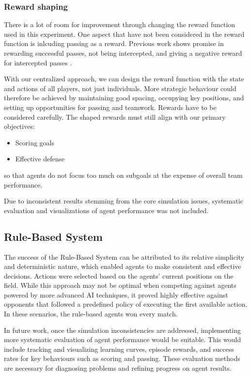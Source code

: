 \subsubsection{Reward shaping}
There is a lot of room for improvement through changing the reward function used in this experiment.
One aspect that have not been considered in the reward function is inlcuding passing as a reward.
Previous work shows promise in rewarding successful passes, not being intercepted, and giving a negative reward for intercepted passes
\cite{SRC2018Team}.

With our centralized approach, we can design the reward function with the state and actions of all players, not just individuals.
More strategic behaviour could therefore be achieved by maintaining good spacing, occupying key positions, and setting up opportunities for passing and teamwork.
Rewards have to be considered carefully. The shaped rewards must still align with our primary objectives:
\begin{itemize}
    \item Scoring goals
    \item Effective defense
\end{itemize}
so that agents do not focus too much on subgoals at the expense of overall team performance.

Due to inconsistent results stemming from the core simulation issues, systematic evaluation and visualizations of agent performance was not included.

\subsection{Rule-Based System}
The success of the Rule-Based System can be attributed to its relative simplicity and deterministic nature, which enabled agents to make consistent and effective decisions. Actions were selected based on the agents' current positions on the field. While this approach may not be optimal when competing against agents powered by more advanced AI techniques, it proved highly effective against opponents that followed a predefined policy of executing the first available action. In these scenarios, the rule-based agents won every match.

In future work, once the simulation inconsistencies are addressed, implementing more systematic evaluation of agent performance would be suitable. This would include tracking and visualizing learning curves, episode rewards, and success rates for key behaviours such as scoring and passing. These evaluation methods are necessary for diagnosing problems and refining progress on agent results.
